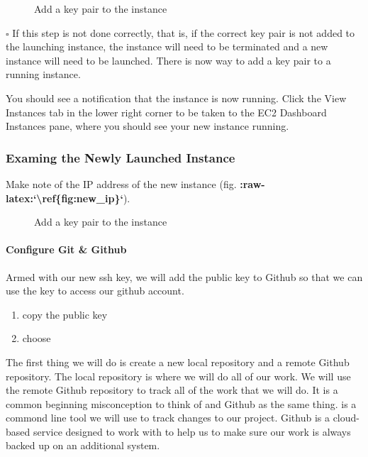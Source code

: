 \documentclass[letterpaper,10pt,english]{sphinxmanual}
\begin{document}
\begin{figure}[htbp]
\centering
\capstart

\noindent{}
\caption{Add a key pair to the instance}\label{\detokenize{02-elastic-compute-cloud:id37}}\end{figure}

\(\square\)  If this step is not done correctly, that is,
if the correct key pair is not added to the launching instance, the
instance will need to be terminated and a new instance will need to be
launched. There is now way to add a key pair to a running instance.

You should see a notification that the instance is now running. Click
the View Instances tab in the lower right corner to be taken to the EC2
Dashboard Instances pane, where you should see your new instance
running.


\subsubsection{Examing the Newly Launched Instance}
\label{\detokenize{02-elastic-compute-cloud:Examing-the-Newly-Launched-Instance}}
Make note of the IP address of the new instance (fig.
{\color{red}\bfseries{}:raw-latex:{}`\textbackslash{}ref\{fig:new\_ip\}{}`}).

\begin{figure}[htbp]
\centering
\capstart

\noindent{}
\caption{Add a key pair to the instance}\label{\detokenize{02-elastic-compute-cloud:id38}}\end{figure}


\paragraph{Configure Git \& Github}
\label{\detokenize{02-elastic-compute-cloud:Configure-Git-_-Github}}
Armed with our new ssh key, we will add the public key to Github so that
we can use the key to access our github account.
\begin{enumerate}
\item {} 
copy the public key

\item {} 
choose

\end{enumerate}

The first thing we will do is create a new local  repository and
a remote Github repository. The local repository is where we will do all
of our work. We will use the remote Github repository to track all of
the work that we will do. It is a common beginning misconception to
think of  and Github as the same thing.  is a commond line
tool we will use to track changes to our project. Github is a
cloud-based service designed to work with  to help us to make
sure our work is always backed up on an additional system.
\end{document}
